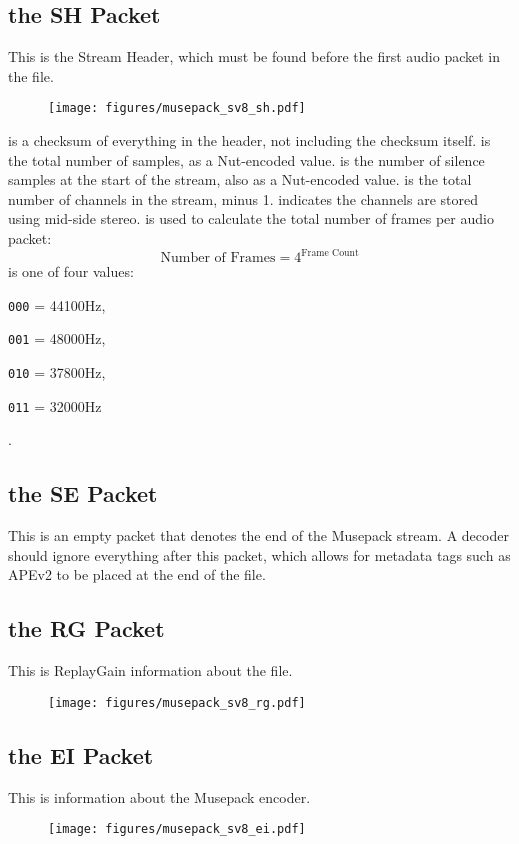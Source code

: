 \subsection{the SH Packet}
This is the Stream Header, which must be found before the first
audio packet in the file.
\begin{figure}[h]
\texttt{[image: figures/musepack\_sv8\_sh.pdf]}
\end{figure}
\par
\noindent
{} is a checksum of everything in the header, not including the
checksum itself.
 is the total number of samples, as a Nut-encoded value.
 is the number of silence samples at the start
of the stream, also as a Nut-encoded value.
 is the total number of channels in the stream, minus 1.
 indicates the channels are stored using mid-side stereo.
 is used to calculate the total number of frames per
audio packet:
\begin{equation}
\text{Number of Frames} = 4 ^ \text{Frame Count}
\end{equation}
 is one of four values:

\begin{inparaenum}
\item[\texttt{000} = ] 44100Hz,
\item[\texttt{001} = ] 48000Hz,
\item[\texttt{010} = ] 37800Hz,
\item[\texttt{011} = ] 32000Hz
\end{inparaenum}
.

\subsection{the SE Packet}
This is an empty packet that denotes the end of the Musepack stream.
A decoder should ignore everything after this packet, which allows
for metadata tags such as APEv2 to be placed at the end of the file.

\subsection{the RG Packet}
This is ReplayGain information about the file.
\begin{figure}[h]
\texttt{[image: figures/musepack\_sv8\_rg.pdf]}
\end{figure}

\subsection{the EI Packet}
This is information about the Musepack encoder.
\begin{figure}[h]
\texttt{[image: figures/musepack\_sv8\_ei.pdf]}
\end{figure}
